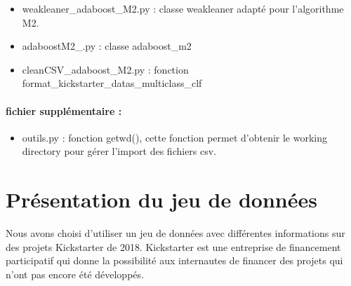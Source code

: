 \documentclass{article}
\begin{document}
\begin{itemize}
  \item weakleaner\_adaboost\_M2.py : classe weakleaner adapté pour l'algorithme M2.
  \item adaboostM2\_.py : classe adaboost\_m2
  \item cleanCSV\_adaboost\_M2.py : fonction  format\_kickstarter\_datas\_multiclass\_clf
\end{itemize}

\paragraph{fichier supplémentaire :}
\begin{itemize}
  \item outils.py : fonction getwd(), cette fonction permet d'obtenir le working directory pour gérer l'import des fichiers csv. 
\end{itemize}

\section{Présentation du jeu de données}

Nous avons choisi d'utiliser un jeu de données avec différentes informations sur des projets Kickstarter de 2018. Kickstarter est une entreprise de financement participatif qui donne la possibilité aux internautes de financer des projets qui n'ont pas encore été développés.\newline 
\end{document}
